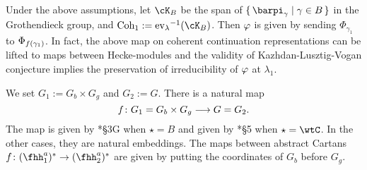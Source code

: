 \documentclass[12pt,a4paper]{amsart}
\newcommand{\trivial}[2][]{\if\relax\detokenize{#1}\relax
  {%
      \color{orange} \vspace{0em} $[$  #2 $]$
      \color{black}
  }
  \else
\ifx#1h
\ifcsname showtrivial\endcsname
{%
    \color{orange} \vspace{0em}  $[$ #2 $]$
    \color{black}
}
\fi
\else {\red Wrong argument!} \fi
\fi
}
\numberwithin{equation}{section}
\newtheorem{lem}[thm]{Lemma}
\theoremstyle{remark}
\def\Coh{\mathrm{Coh}}
\def\ev#1{{\mathrm{ev}_{#1}}}
\newcommand{\Grt}{\cK}
\begin{document}
Under the above assumptions, let $\Grt_{B}$ be the span of
$\set{\barpi_{\gamma}|\gamma\in B}$ in the
Grothendieck group, and $\Coh_{1} := \ev{\lambda}^{-1}(\Grt_{B})$.
Then $\varphi$ is given by sending $\Phi_{\gamma_{1}}$ to
$\Phi_{f(\gamma_{1})}$. In fact, the above map on coherent continuation
representations can be lifted to maps between Hecke-modules and the validity of
Kazhdan-Lusztig-Vogan conjecture implies the preservation of irreducibility of
$\varphi$ at $\lambda_{1}$.





We set $G_{1} := G_{b}\times G_{g}$ and $G_{2}:=G$.
There is a natural map
\[
f\colon G_{1} = G_{b}\times G_{g}\longrightarrow G = G_{2}.
\]
The map is given by \cite{GI}*{\S 3G} when $\star = B$ and given by
\cite{RT2}*{\S 5} when $\star = \wtC$. In the other cases, they are natural
embeddings. The maps between abstract Cartans
$\ff\colon \fhhaso\rightarrow \fhhast$ are given by putting the coordinates of
$G_{b}$ before $G_{g}$.
\end{document}
